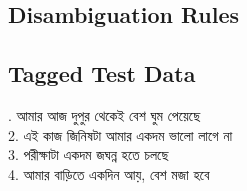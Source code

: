 \documentclass[11pt,a4paper,twocolumn]{article}
\begin{document}
	\subsection{Disambiguation Rules}
	
	\subsection{Tagged Test Data}	
	{. \textcolor{diff}{আমার আজ দুপুর থেকেই বেশ ঘুম পেয়েছে} \\
	$ $\\
	2. \textcolor{diff}{এই কাজ জিনিষটা আমার একদম ভালো লাগে না} \\
	$ $\\
	3. \textcolor{diff}{পরীক্ষাটা একদম জঘন্ন হতে চলছে} \\
	$ $\\
	4. \textcolor{diff}{আমার বাড়িতে একদিন আয়, বেশ মজা হবে} \\
	}
\end{document}
